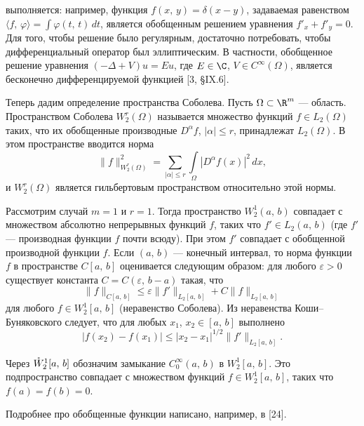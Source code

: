 \documentclass[a4paper
]{article}
\begin{document}
выполняется: например, функция $f(x, \, y)=\delta(x-y)$, задаваемая
равенством $\langle
f, \, \varphi\rangle =\int \varphi(t, \, t)\, dt$, является
обобщенным решением уравнения $f'_x+f'_y=0$. Для того, чтобы
решение было регулярным, достаточно потребовать, чтобы
дифференциальный оператор был эллиптическим. В частности,
обобщенное решение уравнения $(-\Delta +V)u=Eu$, где $E\in \C$,
$V\in C^\infty(\Omega)$, является бесконечно дифференцируемой
функцией [3, \S IX.6]. \par Теперь дадим определение
пространства Соболева. Пусть $\Omega\subset \R^m$ --- область.
Пространством Соболева $W_2^r(\Omega)$ называется множество
функций $f\in L_2(\Omega)$ таких, что их обобщенные производные
$D^\alpha f$, $|\alpha|\le r$, принадлежат $L_2(\Omega)$. В этом
пространстве вводится норма $$\|f\|^2_{W^r_2(\Omega)}= \sum
\limits_{|\alpha|\le r}\int \limits_{\Omega}|D^\alpha f(x)|^2\,
dx,$$ и $W^r_2(\Omega)$ является гильбертовым пространством
относительно этой нормы. \par Рассмотрим случай $m=1$ и $r=1$.
Тогда пространство $W^1_2(a, \, b)$ совпадает с множеством
абсолютно непрерывных функций $f$, таких что $f'\in L_2(a, \, b)$
(где $f'$ --- производная функции $f$ почти всюду). При этом $f'$
совпадает с обобщенной производной функции $f$. Если $(a, \, b)$
--- конечный интервал, то норма функции $f$ в пространстве $C[a,
\, b]$ оценивается следующим образом: для любого $\varepsilon>0$
существует константа $C=C(\varepsilon, \, b-a)$ такая, что $$\|f\|
_{C[a, \, b]}\le \varepsilon \|f'\|_{L_2[a, \, b]}+C\|f\|_{L_2[a,
\, b]}$$ для любого $f\in W^1_2[a, \, b]$ (неравенство Соболева).
Из неравенства Коши--Буняковского следует, что для любых $x_1$,
$x_2\in [a, \, b]$ выполнено $$|f(x_2)-f(x_1)|\le
|x_2-x_1|^{1/2}\|f'\|_{L_2[a, \, b]}.$$ \par Через $\mathaccent'27
W^1_2[a, \, b]$ обозначим замыкание $C_0^\infty (a, \, b)$ в
$W^1_2[a, \, b]$. Это подпространство совпадает с множеством
функций $f\in W^1_2[a, \, b]$, таких что $f(a)=f(b)=0$. \par
Подробнее про обобщенные функции написано, например, в [24].
\end{document}
